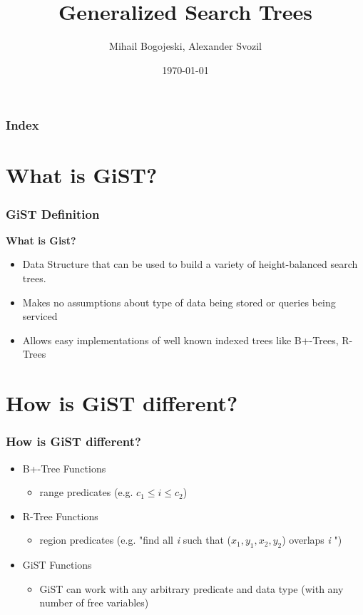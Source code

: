 \documentclass{beamer}
\title{Generalized Search Trees}
\author{Mihail Bogojeski, Alexander Svozil}
\date{\today}
\begin{document}
\maketitle
\begin{frame}
\frametitle {Index}
\tableofcontents

\end{frame}

 
\section {What is GiST?}
\begin{frame}%
  \frametitle{GiST Definition} %
  \textbf {What is Gist?}
  \begin {itemize}
  \item Data Structure that can be used to build a variety of height-balanced search trees.
  \pause \item Makes no assumptions about type of data being stored or queries being serviced
  \pause \item Allows easy implementations of well known indexed trees like B+-Trees, R-Trees
  \end {itemize}
\end{frame}

\section {How is GiST different?}
\begin{frame}%
  \frametitle{How is GiST different?} %
  
  \begin {itemize}
  \item  B+-Tree Functions 
  \begin {itemize}
    \item range predicates (e.g. $c_1 \leq i \leq c_2$)
  \end {itemize}
  \pause \item R-Tree Functions 
  \begin {itemize}
    \item region predicates (e.g. "find all \emph{i} such that  ($x_1,y_1,x_2,y_2$) overlaps \emph{i} ")
  \end {itemize} 
  \pause \item GiST Functions
  \begin {itemize}
    \item GiST can work with any arbitrary predicate and data type (with any number of free variables)
  \end {itemize} 
  
  \end {itemize}
\end{frame}
\end{document}
